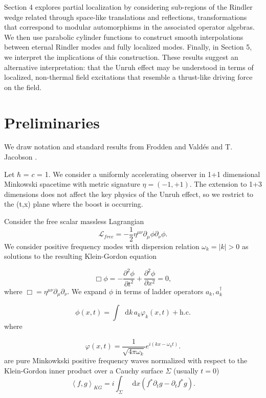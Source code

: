 \documentclass[12pt,a4paper]{article}
\newcommand*\diff{\mathop{}\!\mathrm{d}}
\begin{document}
Section 4 explores partial localization by considering sub-regions of the Rindler wedge related through space-like translations and reflections, transformations that correspond to modular automorphisms in the associated operator algebras. We then use parabolic cylinder functions to construct smooth interpolations between eternal Rindler modes and fully localized modes. Finally, in Section 5, we interpret the implications of this construction. These results suggest an alternative interpretation: that the Unruh effect may be understood in terms of localized, non-thermal field excitations that resemble a thrust-like driving force on the field.

\section{Preliminaries}

We draw notation and standard results from Frodden and Vald{\'{e}}s \cite{frodden2018unruh} and T. Jacobson \cite{jacobson2005introduction}.


Let $\hbar$ = $c$ = 1. We consider a uniformly accelerating observer in 1+1 dimensional Minkowski spacetime with metric signature $\eta=(-1,+1)$. The extension to 1+3 dimensions does not affect the key physics of the Unruh effect, so we restrict to the (t,x) plane where the boost is occurring.

Consider the free scalar massless Lagrangian
\begin{equation}
\mathscr{L}_{free} = -\frac{1}{2} \eta^{\mu\nu}\partial_\mu \phi \partial_\nu \phi.
\end{equation}
We consider positive frequency modes with dispersion relation $\omega_k = |k| > 0$ as solutions to the resulting Klein-Gordon equation 

\begin{equation}
  \Box \phi = -\frac{\partial^2 \phi}{\partial t^2} + \frac{\partial^2 \phi}{\partial x^2} = 0,
 \label{massless-wave-eq}
\end{equation}
where $\Box = \eta^{\mu\nu} \partial_\mu \partial_\nu$. We expand $\phi$ in terms of ladder operators $a_k, a_k^\dagger$

\begin{equation}
  \phi(x,t) = \int \diff k \, a_k \varphi_k(x,t) + \text{h.c.}
\end{equation}
where

\begin{equation}
  \varphi(x,t) = \frac{1}{\sqrt{4\pi\omega_k}} e^{i(kx - \omega_k t)}.
\label{amode}
\end{equation}
are pure Minkowkski positive frequency waves normalized with respect to the Klein-Gordon inner product over a Cauchy surface $\Sigma$ (usually $t = 0$)
\begin{equation}
  \left<f, g\right>_{KG} = i \int_\Sigma \diff x (f^* \partial_t g - \partial_t f^* g).
\end{equation}
\end{document}
